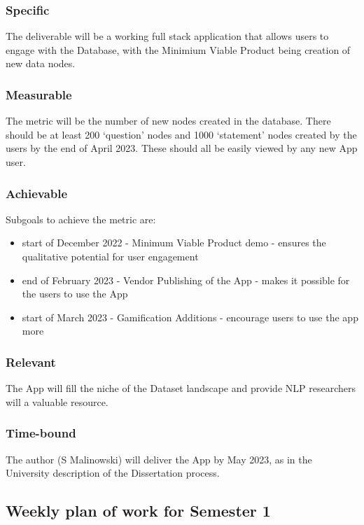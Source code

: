 \documentclass{article}
\begin{document}
\subsubsection{Specific}
The deliverable will be a working full stack application that allows users to engage with the Database, with the Minimium Viable Product being creation of new data nodes.

\subsubsection{Measurable}
  The metric will be the number of new nodes created in the database. There should be at least 200 `question' nodes and 1000 `statement' nodes created by the users by the end of April 2023.
  These should all be easily viewed by any new App user.

\subsubsection{Achievable}
Subgoals to achieve the metric are:
\begin{itemize}
  \item start of December 2022 - Minimum Viable Product demo - ensures the qualitative potential for user engagement
  \item end of February 2023 - Vendor Publishing of the App - makes it possible for the users to use the App
  \item start of March 2023 - Gamification Additions - encourage users to use the app more
\end{itemize}

\subsubsection{Relevant}
The App will fill the niche of the Dataset landscape and provide NLP researchers will a valuable resource.

\subsubsection{Time-bound}
The author (S Malinowski) will deliver the App by May 2023, as in the University description of the Dissertation process.

\subsection{Weekly plan of work for Semester 1}
\end{document}
